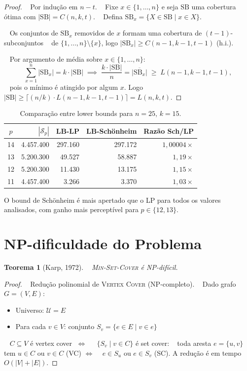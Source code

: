 \documentclass[12pt,a4paper]{article}
\newtheorem{theorem}{Teorema}[section]
\theoremstyle{definition}
\newcommand{\SB}{\mathrm{SB}}
\begin{document}
\begin{proof}
  Por indução em $n - t$.
  Fixe $x \in \{1,\ldots,n\}$ e seja $\SB$ uma cobertura ótima com $|\SB| = C(n,k,t)$.
  Defina $\SB_x = \{X \in \SB \mid x \in X\}$.

  Os conjuntos de $\SB_x$ removidos de $x$ formam uma cobertura de $(t-1)$-subconjuntos
  de $\{1,\ldots,n\} \setminus \{x\}$, logo $|\SB_x| \geq C(n-1, k-1, t-1)$ (h.i.).

  Por argumento de média sobre $x \in \{1,\ldots,n\}$:
  \[
    \sum_{x=1}^{n} |\SB_x| = k \cdot |\SB|
    \;\implies\;
    \frac{k \cdot |\SB|}{n} = \overline{|\SB_x|} \;\geq\; L(n-1, k-1, t-1),
  \]
  pois o mínimo é atingido por algum $x$. Logo
  $|\SB| \geq \lceil (n/k) \cdot L(n-1, k-1, t-1) \rceil = L(n, k, t)$.
\end{proof}

\begin{table}[H]
\centering
\caption{Comparação entre lower bounds para $n=25$, $k=15$.}
\begin{tabular}{crrrr}
\toprule
$p$ & $|\mathcal{S}_p|$ & LB-LP & LB-Schönheim & Razão Sch/LP \\
\midrule
14 & 4.457.400 & 297.160 & 297.172 & $1{,}00004\times$ \\
13 & 5.200.300 & 49.527 & 58.887 & $1{,}19\times$ \\
12 & 5.200.300 & 11.430 & 13.175 & $1{,}15\times$ \\
11 & 4.457.400 & 3.266 & 3.370 & $1{,}03\times$ \\
\bottomrule
\end{tabular}
\end{table}

O bound de Schönheim é mais apertado que o LP para todos os valores analisados, com ganho mais perceptível para $p \in \{12, 13\}$.

\section{NP-dificuldade do Problema}

\begin{theorem}[Karp, 1972]\label{thm:np}
  \textsc{Min-Set-Cover} é NP-difícil.
\end{theorem}

\begin{proof}
  Redução polinomial de \textsc{Vertex Cover} (NP-completo).
  Dado grafo $G = (V, E)$:
  \begin{itemize}
    \item Universo: $\mathcal{U} = E$
    \item Para cada $v \in V$: conjunto $S_v = \{e \in E \mid v \in e\}$
  \end{itemize}
  $C \subseteq V$ é vertex cover $\;\Longleftrightarrow\;$
  $\{S_v \mid v \in C\}$ é set cover:
  toda aresta $e = \{u, v\}$ tem $u \in C$ ou $v \in C$ (VC) $\Leftrightarrow$
  $e \in S_u$ ou $e \in S_v$ (SC). A redução é em tempo $O(|V| + |E|)$. \qedhere
\end{proof}
\end{document}
